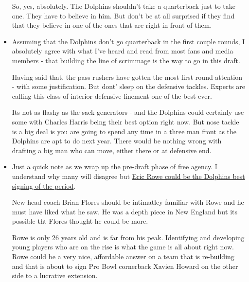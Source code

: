 \begin{itemize}
So, yes, absolutely.  The Dolphins shouldn't take a quarterback just to take one.  They have to believe in him.  But don't be at all surprised if they find that they believe in one of the ones that are right in front of them.

\item Assuming that the Dolphins don't go quarterback in the first couple rounds, I absolutely agree with what I've heard and read from most fans and media members - that building the line of scrimmage is the way to go in this draft.

  Having said that, the pass rushers have gotten the most first round attention - with some justification.  But dont' sleep on the defensive tackles.  Experts are calling this class of interior defensive linement one of the best ever.

  Its not as flashy as the sack generators - and the Dolphins could certainly use some with Charles Harris being their best option right now.  But nose tackle is a big deal is you are going to spend any time in a three man front as the Dolphins are apt to do next year.  There would be nothing wrong with drafting a big man who can move, either there or at defensive end.

  
\item  Just a quick note as we wrap up the pre-draft phase of free agency.  I understand why many will disagree but \href{https://www.sun-sentinel.com/sports/miami-dolphins/fl-sp-dolphins-eric-rowe-20190313-story.html}{Eric Rowe could be the Dolphins best signing of the period}.

  New head coach Brian Flores should be intimatley familiar with Rowe and he must have liked what he saw.  He was a depth piece in New England but its possible tht Flores thought he could be more.

  Rowe is only 26 years old and is far from his peak.  Identifying and developing young players who are on the rise is what the game is all about right now.  Rowe could be a very nice, affordable answer on a team that is re-building and that is about to sign Pro Bowl cornerback Xavien Howard on the other side to a lucrative extension.
\end{itemize}
